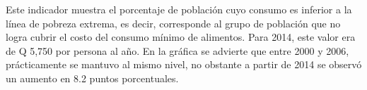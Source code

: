 Este indicador muestra el porcentaje de población cuyo consumo es inferior a la línea de pobreza extrema, es decir, corresponde al grupo de población que no logra cubrir el costo del consumo mínimo de alimentos. Para 2014, este valor era de Q 5,750 por persona al año. En la gráfica se advierte que entre 2000 y 2006, prácticamente se mantuvo al mismo nivel, no obstante a partir de 2014 se observó un aumento en 8.2 puntos porcentuales.
